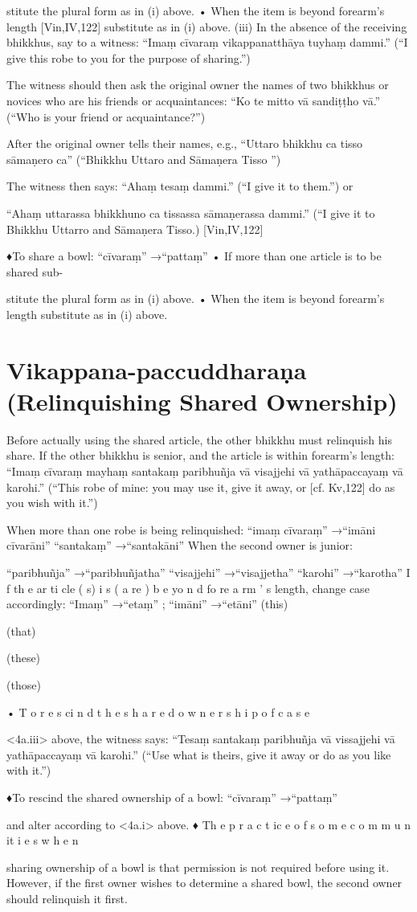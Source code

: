 stitute the plural form as in (i) above.
• When the item is beyond forearm’s length
[Vin,IV,122]
substitute as in (i) above.
(iii) In the absence of the receiving bhikkhus,
say to a witness:
“Imaṃ cīvaraṃ vikappanatthāya tuyhaṃ dammi.”
(“I give this robe to you for the purpose of sharing.”)

The witness should then ask the original
owner the names of two bhikkhus or novices
who are his friends or acquaintances:
“Ko te mitto vā sandiṭṭho vā.”
(“Who is your friend or acquaintance?”)

After the original owner tells their names, e.g.,
“Uttaro bhikkhu ca tisso sāmaṇero ca”
(“Bhikkhu Uttaro and Sāmaṇera Tisso ”)

The witness then says:
“Ahaṃ tesaṃ dammi.”
(“I give it to them.”)
or

“Ahaṃ uttarassa bhikkhuno ca tissassa
sāmaṇerassa dammi.”
(“I give it to Bhikkhu Uttarro and Sāmaṇera Tisso.)
[Vin,IV,122]

♦To share a bowl: “cīvaraṃ” →“pattaṃ”
• If more than one article is to be shared sub-

stitute the plural form as in (i) above.
• When the item is beyond forearm’s length
substitute as in (i) above.

\section{Vikappana-paccuddharaṇa (Relinquishing Shared Ownership)}

Before actually using the shared article, the
other bhikkhu must relinquish his share.
If the other bhikkhu is senior, and the article
is within forearm’s length:
“Imaṃ cīvaraṃ mayhaṃ santakaṃ paribhuñja
vā visajjehi vā yathāpaccayaṃ vā karohi.”
(“This robe of mine: you may use it, give it away, or
[cf. Kv,122]
do as you wish with it.”)

When more than one robe is being relinquished:
“imaṃ cīvaraṃ” →“imāni cīvarāni”
“santakaṃ” →“santakāni”
When the second owner is junior:

“paribhuñja” →“paribhuñjatha”
“visajjehi” →“visajjetha”
“karohi” →“karotha”
I f th e ar ti cle ( s) i s ( a re ) b e yo n d fo re a rm ’ s
length, change case accordingly:
“Imaṃ” →“etaṃ” ; “imāni” →“etāni”
(this)

(that)

(these)

(those)

• T o r e s ci n d t h e s h a r e d o w n e r s h i p o f c a s e

<4a.iii> above, the witness says:
“Tesaṃ santakaṃ paribhuñja vā vissajjehi vā
yathāpaccayaṃ vā karohi.”
(“Use what is theirs, give it away or do as you like
with it.”)

♦To rescind the shared ownership of a bowl:
“cīvaraṃ” →“pattaṃ”

and alter according to <4a.i> above.
♦ Th e p r a c t ic e o f s o m e c o m m u n it i e s w h e n

sharing ownership of a bowl is that permission is not required before using it. However,
if the first owner wishes to determine a
shared bowl, the second owner should relinquish it first.


